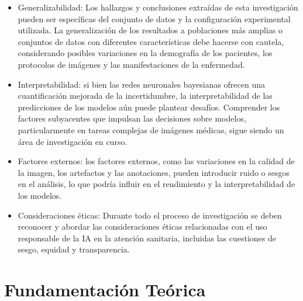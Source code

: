 \documentclass[10pt, oneside, a4paper]{article}
\begin{document}
\begin{itemize}
		\item Generalizabilidad: Los hallazgos y conclusiones extraídas de esta investigación pueden ser específicas del conjunto de datos y la configuración experimental utilizada. La generalización de los resultados a poblaciones más amplias o conjuntos de datos con diferentes características debe hacerse con cautela, considerando posibles variaciones en la demografía de los pacientes, los protocolos de imágenes y las manifestaciones de la enfermedad.
		
		\item Interpretabilidad: si bien las redes neuronales bayesianas ofrecen una cuantificación mejorada de la incertidumbre, la interpretabilidad de las predicciones de los modelos aún puede plantear desafíos. Comprender los factores subyacentes que impulsan las decisiones sobre modelos, particularmente en tareas complejas de imágenes médicas, sigue siendo un área de investigación en curso.
		
		\item Factores externos: los factores externos, como las variaciones en la calidad de la imagen, los artefactos y las anotaciones, pueden introducir ruido o sesgos en el análisis, lo que podría influir en el rendimiento y la interpretabilidad de los modelos.
		
		\item Consideraciones éticas: Durante todo el proceso de investigación se deben reconocer y abordar las consideraciones éticas relacionadas con el uso responsable de la IA en la atención sanitaria, incluidas las cuestiones de sesgo, equidad y transparencia.
	\end{itemize}

					
	\section{Fundamentación Teórica} \label{marco_teorico}
	
	
	
\end{document}
